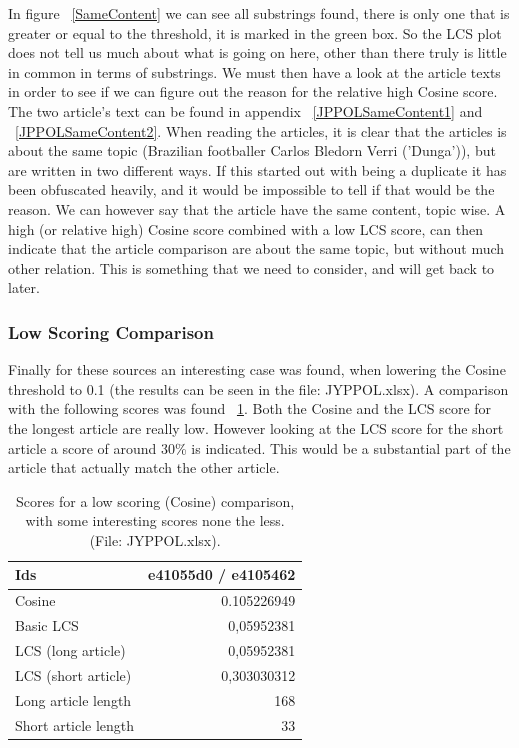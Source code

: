 In figure ~\ref{SameContent} we can see all substrings found, there is only one that is greater or equal to the threshold, it is marked in the green box. So the LCS plot does not tell us much about what is going on here, other than there truly is little in common in terms of substrings. We must then have a look at the article texts in order to see if we can figure out the reason for the relative high Cosine score. The two article's text can be found in appendix ~\ref{JPPOLSameContent1} and ~\ref{JPPOLSameContent2}. When reading the articles, it is clear that the articles is about the same topic (Brazilian footballer Carlos Bledorn Verri ('Dunga')), but are written in two different ways. If this started out with being a duplicate it has been obfuscated heavily, and it would be impossible to tell if that would be the reason. We can however say that the article have the same content, topic wise. A high (or relative high) Cosine score combined with a low LCS score, can then indicate that the article comparison are about the same topic, but without much other relation. This is something that we need to consider, and will get back to later.

\subsubsection{Low Scoring Comparison}
Finally for these sources an interesting case was found, when lowering the Cosine threshold to 0.1 (the results can be seen in the file: JYPPOL.xlsx). A comparison with the following scores was found ~\ref{JPPOLLowScoreMatch}. Both the Cosine and the LCS score for the longest article are really low. However looking at the LCS score for the short article a score of around 30\% is indicated. This would be a substantial part of the article that actually match the other article.

\begin{table}
\begin{center}
	\begin{tabular}{l | r}
	Ids & e41055d0 / e4105462\\ \hline
	Cosine & 0.105226949\\ \hline
	Basic LCS & 0,05952381\\ \hline
	LCS (long article) & 0,05952381\\ \hline
	LCS (short article) & 0,303030312\\ \hline
	Long article length & 168\\ \hline
	Short article length & 33\\ \hline	
	\end{tabular}
\end{center}
\caption{Scores for a low scoring (Cosine) comparison, with some interesting scores none the less. (File: JYPPOL.xlsx).}
\label{JPPOLLowScoreMatch}
\end{table}

